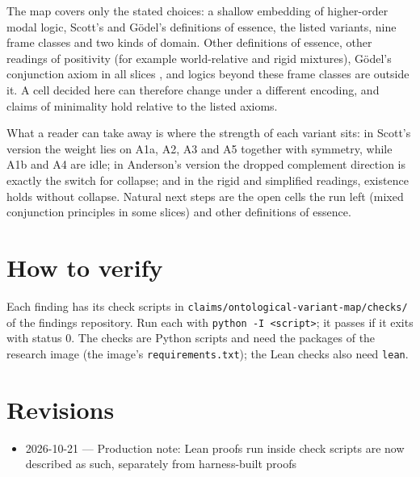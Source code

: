 \documentclass{article}
\begin{document}
The map covers only the stated choices: a shallow embedding of higher-order modal logic, Scott's
and Gödel's definitions of essence, the listed variants, nine frame classes and two kinds of
domain. Other definitions of essence, other readings of positivity (for example world-relative
and rigid mixtures), Gödel's conjunction axiom in all slices \cite{benzmueller2026ultrafilters}, and
logics beyond these frame classes are outside it. A cell decided here can therefore change under
a different encoding, and claims of minimality hold relative to the listed axioms.

What a reader can take away is where the strength of each variant sits: in Scott's version the
weight lies on A1a, A2, A3 and A5 together with symmetry, while A1b and A4 are idle; in
Anderson's version the dropped complement direction is exactly the switch for collapse; and in
the rigid and simplified readings, existence holds without collapse. Natural next steps are the
open cells the run left (mixed conjunction principles in some slices) and other definitions of
essence.

\section{How to verify}

Each finding has its check scripts in \texttt{claims/ontological-variant-map/checks/} of the findings repository. Run each with \texttt{python -I <script>}; it passes if it exits with status 0. The checks are Python scripts and need the packages of the research image (the image's \texttt{requirements.txt}); the Lean checks also need \texttt{lean}.

\section{Revisions}

\begin{itemize}
\item 2026-10-21 --- Production note: Lean proofs run inside check scripts are now described as such, separately from harness-built proofs
\end{itemize}



\end{document}
